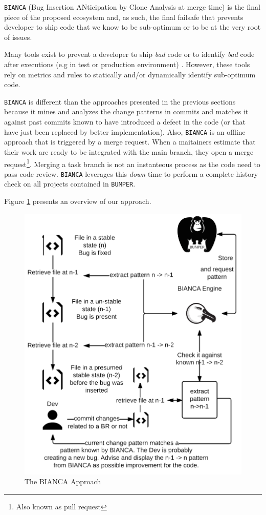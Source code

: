 

{\tt BIANCA} (Bug Insertion ANticipation by Clone Analysis at merge time) is the final piece of the proposed ecosystem and, as such, the final failsafe that prevents developer to ship code that we know to be sub-optimum or to be at the very root of issues.

Many tools exist to prevent a developer to ship {\it bad} code \cite{Dangel2000,Hovemeyer2007,Moha2010} or to identify {\it bad} code after executions (e.g in test or production environment) \cite{Nayrolles,Nayrolles2013a}.
However, these tools rely on metrics and rules to statically and/or dynamically identify sub-optimum code.

{\tt BIANCA} is different than the approaches presented in the previous sections  because it mines and analyzes the change patterns in commits and matches it against past commits known to have introduced a defect in the code (or that have just been replaced by better implementation).
Also, {\tt BIANCA} is an offline approach that is triggered by a merge request.
When a maitainers estimate that their work are ready to be integrated with the main branch, they open a merge request\footnote{Also known as pull request}.
Merging a task branch is not an instanteous process as the code need to pass code review.
{\tt BIANCA} leverages this {\it down} time to perform a complete history check on all projects contained in {\tt BUMPER}.

Figure \ref{fig:bianca-approach} presents an overview of our approach.

\begin{figure}[h!]
  \centering
    \includegraphics{media/bianca-approach.png}
    \caption{The BIANCA Approach
    \label{fig:bianca-approach}}
\end{figure}

